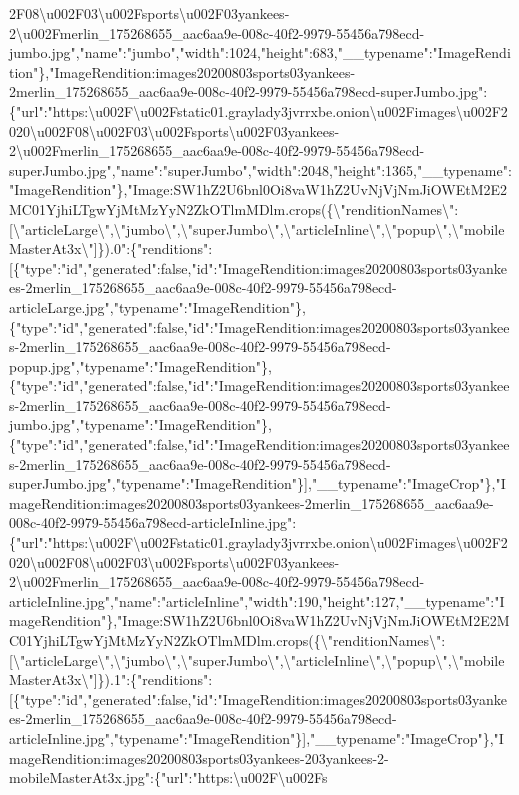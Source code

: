 2F08\textbackslash{}u002F03\textbackslash{}u002Fsports\textbackslash{}u002F03yankees-2\textbackslash{}u002Fmerlin\_175268655\_aac6aa9e-008c-40f2-9979-55456a798ecd-jumbo.jpg","name":"jumbo","width":1024,"height":683,"\_\_typename":"ImageRendition"\},"ImageRendition:images20200803sports03yankees-2merlin\_175268655\_aac6aa9e-008c-40f2-9979-55456a798ecd-superJumbo.jpg":\{"url":"https:\textbackslash{}u002F\textbackslash{}u002Fstatic01.graylady3jvrrxbe.onion\textbackslash{}u002Fimages\textbackslash{}u002F2020\textbackslash{}u002F08\textbackslash{}u002F03\textbackslash{}u002Fsports\textbackslash{}u002F03yankees-2\textbackslash{}u002Fmerlin\_175268655\_aac6aa9e-008c-40f2-9979-55456a798ecd-superJumbo.jpg","name":"superJumbo","width":2048,"height":1365,"\_\_typename":"ImageRendition"\},"Image:SW1hZ2U6bnl0Oi8vaW1hZ2UvNjVjNmJiOWEtM2E2MC01YjhiLTgwYjMtMzYyN2ZkOTlmMDlm.crops(\{\textbackslash{}"renditionNames\textbackslash{}":{[}\textbackslash{}"articleLarge\textbackslash{}",\textbackslash{}"jumbo\textbackslash{}",\textbackslash{}"superJumbo\textbackslash{}",\textbackslash{}"articleInline\textbackslash{}",\textbackslash{}"popup\textbackslash{}",\textbackslash{}"mobileMasterAt3x\textbackslash{}"{]}\}).0":\{"renditions":{[}\{"type":"id","generated":false,"id":"ImageRendition:images20200803sports03yankees-2merlin\_175268655\_aac6aa9e-008c-40f2-9979-55456a798ecd-articleLarge.jpg","typename":"ImageRendition"\},\{"type":"id","generated":false,"id":"ImageRendition:images20200803sports03yankees-2merlin\_175268655\_aac6aa9e-008c-40f2-9979-55456a798ecd-popup.jpg","typename":"ImageRendition"\},\{"type":"id","generated":false,"id":"ImageRendition:images20200803sports03yankees-2merlin\_175268655\_aac6aa9e-008c-40f2-9979-55456a798ecd-jumbo.jpg","typename":"ImageRendition"\},\{"type":"id","generated":false,"id":"ImageRendition:images20200803sports03yankees-2merlin\_175268655\_aac6aa9e-008c-40f2-9979-55456a798ecd-superJumbo.jpg","typename":"ImageRendition"\}{]},"\_\_typename":"ImageCrop"\},"ImageRendition:images20200803sports03yankees-2merlin\_175268655\_aac6aa9e-008c-40f2-9979-55456a798ecd-articleInline.jpg":\{"url":"https:\textbackslash{}u002F\textbackslash{}u002Fstatic01.graylady3jvrrxbe.onion\textbackslash{}u002Fimages\textbackslash{}u002F2020\textbackslash{}u002F08\textbackslash{}u002F03\textbackslash{}u002Fsports\textbackslash{}u002F03yankees-2\textbackslash{}u002Fmerlin\_175268655\_aac6aa9e-008c-40f2-9979-55456a798ecd-articleInline.jpg","name":"articleInline","width":190,"height":127,"\_\_typename":"ImageRendition"\},"Image:SW1hZ2U6bnl0Oi8vaW1hZ2UvNjVjNmJiOWEtM2E2MC01YjhiLTgwYjMtMzYyN2ZkOTlmMDlm.crops(\{\textbackslash{}"renditionNames\textbackslash{}":{[}\textbackslash{}"articleLarge\textbackslash{}",\textbackslash{}"jumbo\textbackslash{}",\textbackslash{}"superJumbo\textbackslash{}",\textbackslash{}"articleInline\textbackslash{}",\textbackslash{}"popup\textbackslash{}",\textbackslash{}"mobileMasterAt3x\textbackslash{}"{]}\}).1":\{"renditions":{[}\{"type":"id","generated":false,"id":"ImageRendition:images20200803sports03yankees-2merlin\_175268655\_aac6aa9e-008c-40f2-9979-55456a798ecd-articleInline.jpg","typename":"ImageRendition"\}{]},"\_\_typename":"ImageCrop"\},"ImageRendition:images20200803sports03yankees-203yankees-2-mobileMasterAt3x.jpg":\{"url":"https:\textbackslash{}u002F\textbackslash{}u002Fs